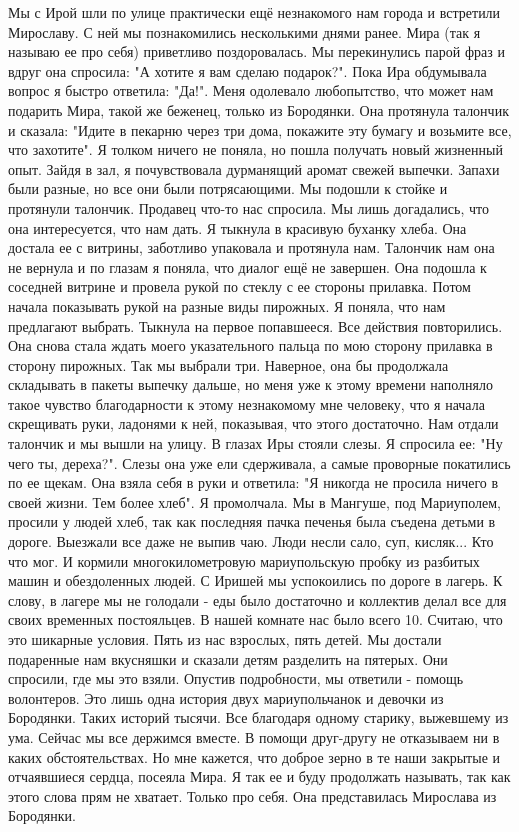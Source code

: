 Мы с Ирой шли по улице практически ещё незнакомого нам города и встретили
Мирославу. С ней мы познакомились несколькими днями ранее. Мира (так я называю
ее про себя) приветливо поздоровалась. Мы перекинулись парой фраз и вдруг она
спросила: "А хотите я вам сделаю подарок?". Пока Ира обдумывала вопрос я быстро
ответила: "Да!". Меня одолевало любопытство, что может нам подарить Мира, такой
же беженец, только из Бородянки. Она протянула талончик и сказала: "Идите в
пекарню через три дома, покажите эту бумагу и возьмите все, что захотите". Я
толком ничего не поняла, но пошла получать новый жизненный опыт. Зайдя в зал, я
почувствовала дурманящий аромат свежей выпечки. Запахи были разные, но все они
были потрясающими. Мы подошли к стойке и протянули талончик. Продавец что-то
нас спросила. Мы лишь догадались, что она интересуется, что нам дать. Я тыкнула
в красивую буханку хлеба. Она достала ее с витрины, заботливо упаковала и
протянула нам. Талончик нам она не вернула и по глазам я поняла, что диалог ещё
не завершен. Она подошла к соседней витрине и провела рукой по стеклу с ее
стороны прилавка. Потом начала показывать рукой на разные виды пирожных. Я
поняла, что нам предлагают выбрать. Тыкнула на первое попавшееся. Все действия
повторились. Она снова стала ждать моего указательного пальца по мою сторону
прилавка в сторону пирожных. Так мы выбрали три. Наверное, она бы продолжала
складывать в пакеты выпечку дальше, но меня уже к этому времени наполняло такое
чувство благодарности к этому незнакомому мне человеку, что я начала скрещивать
руки, ладонями к ней, показывая, что этого достаточно. Нам отдали талончик и мы
вышли на улицу. В глазах Иры стояли слезы. Я спросила ее: "Ну чего ты,
дереха?". Слезы она уже ели сдерживала, а самые проворные покатились по ее
щекам. Она взяла себя в руки и ответила: "Я никогда не просила ничего в своей
жизни. Тем более хлеб". Я промолчала. Мы в Мангуше, под Мариуполем, просили у
людей хлеб, так как последняя пачка печенья была съедена детьми в дороге.
Выезжали все даже не выпив чаю. Люди несли сало, суп, кисляк... Кто что мог. И
кормили многокилометровую мариупольскую пробку из разбитых машин и обездоленных
людей. С Иришей мы успокоились по дороге в лагерь. К слову, в лагере мы не
голодали - еды было достаточно и коллектив делал все для своих временных
постояльцев. В нашей комнате нас было всего 10. Считаю, что это шикарные
условия. Пять из нас взрослых, пять детей. Мы достали подаренные нам вкусняшки
и сказали детям разделить на пятерых. Они спросили, где мы это взяли. Опустив
подробности, мы ответили - помощь волонтеров. Это лишь одна история двух
мариупольчанок и девочки из Бородянки. Таких историй тысячи. Все благодаря
одному старику, выжевшему из ума. Сейчас мы все держимся вместе. В помощи
друг-другу не отказываем ни в каких обстоятельствах. Но мне кажется, что доброе
зерно в те наши закрытые и отчаявшиеся сердца, посеяла Мира. Я так ее и буду
продолжать называть, так как этого слова прям не хватает. Только про себя. Она
представилась Мирослава из Бородянки.

